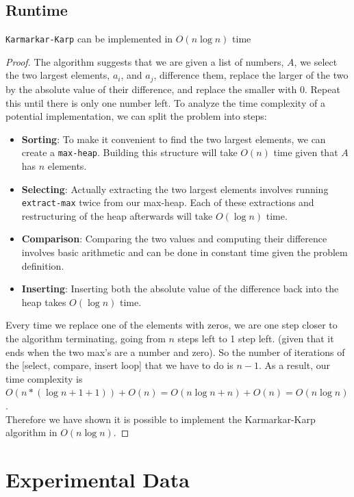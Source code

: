 \documentclass[11pt]{scrartcl}
\theoremstyle{dotlessP}
\theoremstyle{dotlessN}
\theoremstyle{dotN}
\begin{document}
\subsection{Runtime}
\begin{claim}
    \texttt{Karmarkar-Karp} can be implemented in $O(n\log n)$ time
\end{claim}
\begin{proof}
    The algorithm suggests that we are given a list of numbers, $A$, we select the two largest elements, $a_i$, and $a_j$, difference them, replace the larger of the two by the absolute value of their difference, and replace the smaller with 0. Repeat this until there is only one number left. To analyze the time complexity of a potential implementation, we can split the problem into steps:
    \begin{itemize}
        \item \textbf{Sorting}: To make it convenient to find the two largest elements, we can create a \texttt{max-heap}. Building this structure will take $O(n)$ time given that $A$ has $n$ elements.
        \item \textbf{Selecting}: Actually extracting the two largest elements involves running \texttt{extract-max} twice from our max-heap. Each of these extractions and restructuring of the heap afterwards will take $O(\log n)$ time.
        \item \textbf{Comparison}: Comparing the two values and computing their difference involves basic arithmetic and can be done in constant time given the problem definition. 
        \item \textbf{Inserting}: Inserting both the absolute value of the difference back into the heap takes $O(\log n)$ time. 
    \end{itemize}
    Every time we replace one of the elements with zeros, we are one step closer to the algorithm terminating, going from $n$ steps left to 1 step left. (given that it ends when the two max's are a number and zero). So the number of iterations of the [select, compare, insert loop] that we have to do is $n-1$. As a result, our time complexity is $O(n * (\log n + 1 + 1)) + O(n) = O(n\log n + n) + O(n) = O(n\log n)$.\\

    Therefore we have shown it is possible to implement the Karmarkar-Karp algorithm in $O(n \log n)$.
\end{proof}
\section{Experimental Data}
\end{document}
